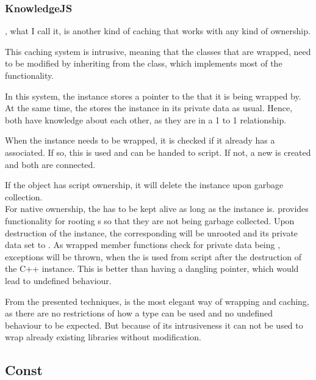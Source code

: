 \subsubsection{KnowledgeJS}

, what I call it, is another kind of caching that works with any kind of ownership.

This caching system is intrusive, meaning that the  classes that are wrapped, need to be modified by inheriting from the   class, which implements most of the functionality.

In this system, the  instance stores a pointer to the  that it is being wrapped by. At the same time, the  stores the  instance in its private data as usual. Hence, both have knowledge about each other, as they are in a 1 to 1 relationship.

When the  instance needs to be wrapped, it is checked if it already has a  associated. If so, this  is used and can be handed to script. If not, a new  is created and both are connected.

If the object has script ownership, it will delete the  instance upon garbage collection.\\
For native ownership, the  has to be kept alive as long as the  instance is.  provides functionality for rooting s so that they are not being garbage collected. Upon destruction of the  instance, the corresponding  will be unrooted and its private data set to . As wrapped member functions check for private data being ,  exceptions will be thrown, when the  is used from script after the destruction of the C++ instance. This is better than having a dangling pointer, which would lead to undefined behaviour.

From the presented techniques,  is the most elegant way of wrapping and caching, as there are no restrictions of how a type can be used and no undefined behaviour to be expected. But because of its intrusiveness it can not be used to wrap already existing libraries without modification.

\subsection{Const}

